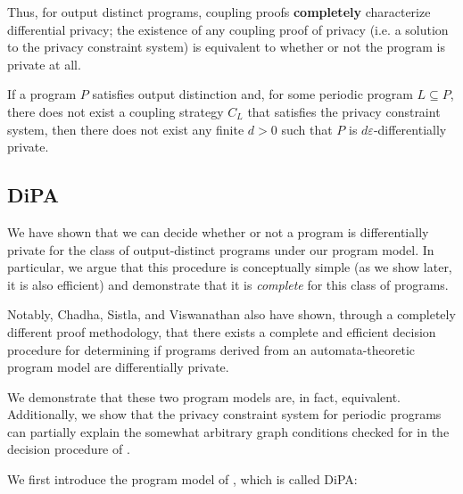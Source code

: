 Thus, for output distinct programs, coupling proofs \textbf{completely} characterize differential privacy; the existence of any coupling proof of privacy (i.e. a solution to the privacy constraint system) is equivalent to whether or not the program is private at all.

\begin{thm}\label{ProgramCounterexampleThm}
    If a program $P$ satisfies output distinction and, for some periodic program $L\subseteq P$, there does not exist a coupling strategy $C_L$ that satisfies the privacy constraint system, then there does not exist any finite $d>0$ such that $P$ is $d\varepsilon$-differentially private.
\end{thm}

\subsection{DiPA}

We have shown that we can decide whether or not a program is differentially private for the class of output-distinct programs under our program model. In particular, we argue that this procedure is conceptually simple (as we show later, it is also efficient) and demonstrate that it is \textit{complete} for this class of programs.

Notably, Chadha, Sistla, and Viswanathan \cite{chadhaLinearTimeDecidability2021} also have shown, through a completely different proof methodology, that there exists a complete and efficient decision procedure for determining if programs derived from an automata-theoretic program model are differentially private. 

We demonstrate that these two program models are, in fact, equivalent. Additionally, we show that the privacy constraint system for periodic programs can partially explain the somewhat arbitrary graph conditions checked for in the decision procedure of \cite{chadhaLinearTimeDecidability2021}.

We first introduce the program model of \cite{chadhaLinearTimeDecidability2021}, which is called DiPA:

